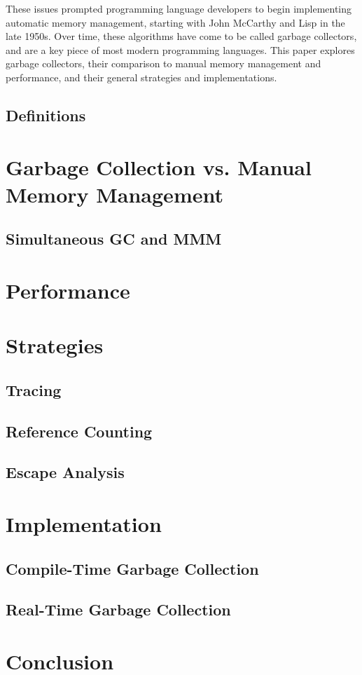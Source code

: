 \documentclass[12pt]{article}
\begin{document}
These issues prompted programming language developers to begin implementing automatic memory management, starting with John McCarthy and Lisp in the late 1950s.\cite{https://www.seas.harvard.edu/courses/cs252/2016fa/16.pdf} Over time, these algorithms have come to be called garbage collectors, and are a key piece of most modern programming languages. This paper explores garbage collectors, their comparison to manual memory management and performance, and their general strategies and implementations. 

\subsection{Definitions}
\section{Garbage Collection vs. Manual Memory Management}
\subsection{Simultaneous GC and MMM}
\section{Performance}
\section{Strategies}
\subsection{Tracing}
\subsection{Reference Counting}
\subsection{Escape Analysis}
\section{Implementation}
\subsection{Compile-Time Garbage Collection}
\subsection{Real-Time Garbage Collection}
\section{Conclusion}
\end{document}
